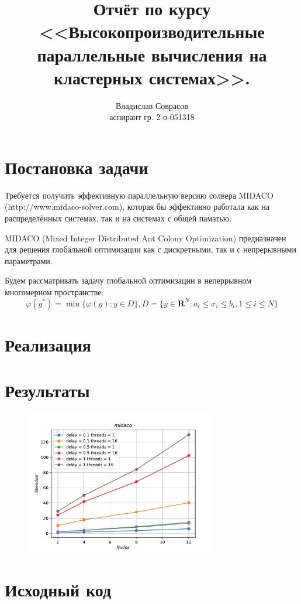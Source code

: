 \documentclass[a4paper]{article}
\begin{document}
\title{Отчёт по курсу <<Высокопроизводительные параллельные вычисления на кластерных системах>>.}
\author{Владислав Соврасов\\ аспирант гр. 2-о-051318}
\date{}
\maketitle

\section{Постановка задачи}

Требуется получить эффективную параллельную версию солвера MIDACO (http://www.midaco-solver.com), которая
бы эффективно работала как на распределённых системах, так и на системах с общей паматью.

MIDACO (Mixed Integer Distributed Ant Colony Optimization) предназначен для решения
глобальной оптимизации как с дискретными, так и с непрерывными параметрами.

Будем рассматривать задачу глобальной оптимизации в неперрывном многомерном пространстве:
\begin{displaymath}
\label{task}
\varphi(y^*)=\min\{\varphi(y):y\in D\},D=\{y\in \mathbf{R}^N:a_i\leqslant x_i\leqslant{b_i}, 1\leqslant{i}\leqslant{N}\}
\end{displaymath}

\section{Реализация}



\section{Результаты}

\begin{figure}[H]
  \center
  \includegraphics[width=0.75\textwidth]{gpu_mpi/gklsh4d/speedup_nodes.pdf}
  \caption{}
  \label{fig:}
\end{figure}

\section{Исходный код}

\end{document}
